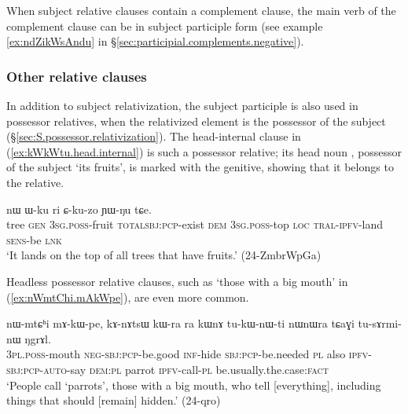 
When subject relative clauses contain a complement clause, the main verb of the complement clause can be in subject participle form (see example \ref{ex:ndZikWsAndu}  in §\ref{sec:participial.complements.negative}).
 
\subsubsection{Other relative clauses}  \label{sec:subject.participle.other.relative}
In addition to subject relativization, the subject participle is also used in possessor relatives, when the relativized element is the possessor of the subject (§\ref{sec:S.possessor.relativization}).  The head-internal clause in (\ref{ex:kWkWtu.head.internal}) is such a possessor relative; its head noun , possessor of the subject  `its fruits',  is marked with the genitive, showing that it belongs to the relative.  

\begin{exe}
\ex \label{ex:kWkWtu.head.internal}
  nɯ ɯ-ku ri ɕ-ku-zo ɲɯ-ŋu tɕe. \\
 tree \textsc{gen} \textsc{3sg}.\textsc{poss}-fruit \textsc{total}\redp{}\textsc{sbj}:\textsc{pcp}-exist \textsc{dem} \textsc{3sg}.\textsc{poss}-top \textsc{loc} \textsc{tral}-\textsc{ipfv}-land \textsc{sens}-be \textsc{lnk} \\
 \glt `It lands on the top of all trees that have fruits.' (24-ZmbrWpGa)
\end{exe}

 Headless possessor relative clauses, such as   `those with a big mouth' in (\ref{ex:nWmtChi.mAkWpe}), are even more common.

\begin{exe}
\ex \label{ex:nWmtChi.mAkWpe}
\gll nɯ-mtɕʰi mɤ-kɯ-pe, kɤ-nɤtsɯ kɯ-ra ra kɯnɤ tu-kɯ-nɯ-ti nɯnɯra tɕaɣi tu-sɤrmi-nɯ ŋgrɤl. \\
 \textsc{3pl}.\textsc{poss}-mouth \textsc{neg}-\textsc{sbj}:\textsc{pcp}-be.good \textsc{inf}-hide \textsc{sbj}:\textsc{pcp}-be.needed \textsc{pl} also \textsc{ipfv}-\textsc{sbj}:\textsc{pcp}-\textsc{auto}-say \textsc{dem}:\textsc{pl} parrot \textsc{ipfv}-call-\textsc{pl} be.usually.the.case:\textsc{fact} \\
 \glt `People call `parrots', those with a big mouth, who tell [everything], including things that should [remain] hidden.'
 (24-qro) 
\end{exe}
 
